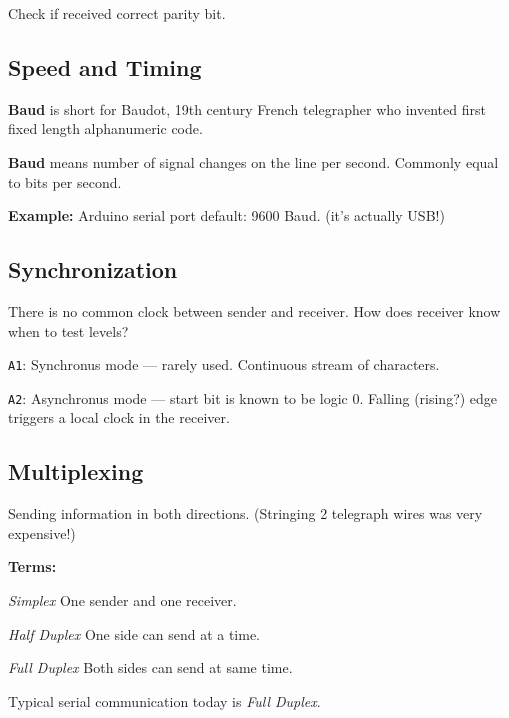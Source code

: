 Check if received correct parity bit. 


\subsection{Speed and Timing}

{\bf Baud} is short for Baudot, 19th century
French telegrapher who invented first fixed length
alphanumeric code.

{\bf Baud} means number of signal changes on the
line per second.  Commonly equal to bits per second.

{\bf Example: }  Arduino serial port default: 9600 Baud. (it's actually USB!)


\subsection{Synchronization}
There is no common clock between sender and
receiver. How does receiver know when to test
levels?

\noindent
{\tt A1}: Synchronus mode --- rarely used.  Continuous
stream of characters.

\noindent
{\tt A2}: Asynchronus mode --- start bit is known
to be logic 0.  Falling (rising?) edge triggers
a local clock in the receiver.


\subsection{Multiplexing}
Sending information in both directions.  (Stringing 2 telegraph wires was very expensive!)

{\bf Terms:}

{\it Simplex}  One sender and one receiver.

{\it Half Duplex} One side can send at a time.

{\it Full Duplex} Both sides can send at same time.

Typical serial communication today is {\it Full Duplex}.
